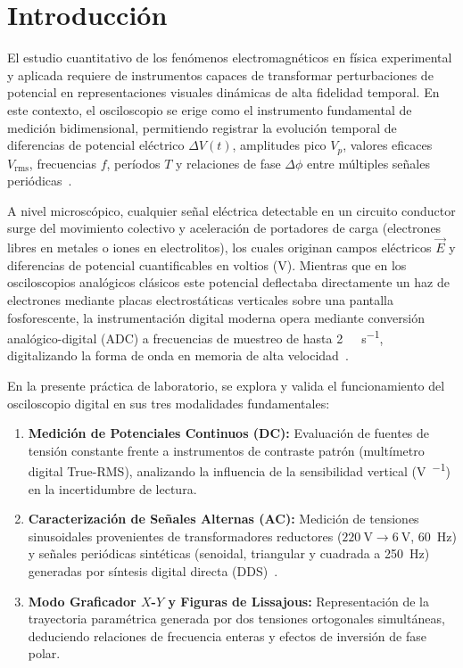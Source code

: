 
\section{Introducción}
\label{sec:introduccion}

El estudio cuantitativo de los fenómenos electromagnéticos en física experimental y aplicada requiere de instrumentos capaces de transformar perturbaciones de potencial en representaciones visuales dinámicas de alta fidelidad temporal. En este contexto, el osciloscopio se erige como el instrumento fundamental de medición bidimensional, permitiendo registrar la evolución temporal de diferencias de potencial eléctrico $\Delta V(t)$, amplitudes pico $V_p$, valores eficaces $V_{\text{rms}}$, frecuencias $f$, períodos $T$ y relaciones de fase $\Delta\phi$ entre múltiples señales periódicas~\cite{serway, halliday}.

A nivel microscópico, cualquier señal eléctrica detectable en un circuito conductor surge del movimiento colectivo y aceleración de portadores de carga (electrones libres en metales o iones en electrolitos), los cuales originan campos eléctricos $\vec{E}$ y diferencias de potencial cuantificables en voltios (\unit{\volt}). Mientras que en los osciloscopios analógicos clásicos este potencial deflectaba directamente un haz de electrones mediante placas electrostáticas verticales sobre una pantalla fosforescente, la instrumentación digital moderna opera mediante conversión analógico-digital (ADC) a frecuencias de muestreo de hasta \qty{2}{\giga\sample\per\second}, digitalizando la forma de onda en memoria de alta velocidad~\cite{rs_rtc1000_specs}.

En la presente práctica de laboratorio, se explora y valida el funcionamiento del osciloscopio digital en sus tres modalidades fundamentales:
\begin{enumerate}
    \item \textbf{Medición de Potenciales Continuos (DC):} Evaluación de fuentes de tensión constante frente a instrumentos de contraste patrón (multímetro digital True-RMS), analizando la influencia de la sensibilidad vertical (\unit{\volt\per\division}) en la incertidumbre de lectura.
    \item \textbf{Caracterización de Señales Alternas (AC):} Medición de tensiones sinusoidales provenientes de transformadores reductores ($\qty{220}{\volt} \to \qty{6}{\volt}$, \qty{60}{\hertz}) y señales periódicas sintéticas (senoidal, triangular y cuadrada a \qty{250}{\hertz}) generadas por síntesis digital directa (DDS)~\cite{owon_ags_spec}.
    \item \textbf{Modo Graficador $X$-$Y$ y Figuras de Lissajous:} Representación de la trayectoria paramétrica generada por dos tensiones ortogonales simultáneas, deduciendo relaciones de frecuencia enteras y efectos de inversión de fase polar.
\end{enumerate}

